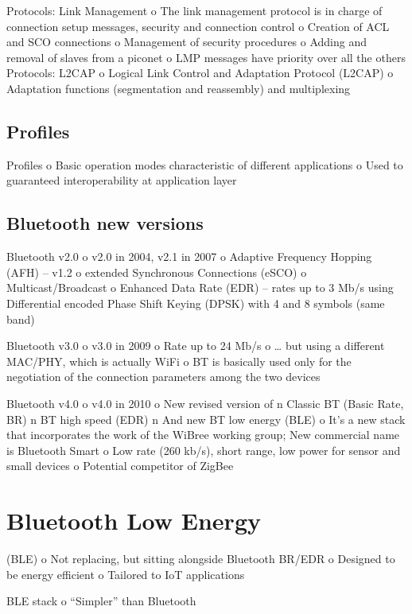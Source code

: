 Protocols: Link Management
o The link management protocol is in
charge of connection setup messages,
security and connection control
o Creation of ACL and SCO connections
o Management of security procedures
o Adding and removal of slaves from a
piconet
o LMP messages have priority over all
the others
Protocols: L2CAP
o Logical Link Control and Adaptation Protocol
(L2CAP)
o Adaptation functions (segmentation and
reassembly) and multiplexing

\subsection{Profiles}
Profiles
o Basic operation modes characteristic of different
applications
o Used to guaranteed interoperability at application
layer






\subsection{Bluetooth new versions}
Bluetooth v2.0
o v2.0 in 2004, v2.1 in 2007
o Adaptive Frequency Hopping (AFH) –
v1.2
o extended Synchronous Connections
(eSCO)
o Multicast/Broadcast
o Enhanced Data Rate (EDR) – rates up
to 3 Mb/s using Differential encoded
Phase Shift Keying (DPSK) with 4 and
8 symbols (same band)

Bluetooth v3.0
o v3.0 in 2009
o Rate up to 24 Mb/s
o … but using a different MAC/PHY,
which is actually WiFi
o BT is basically used only for the
negotiation of the connection
parameters among the two devices

Bluetooth v4.0
o v4.0 in 2010
o New revised version of
n Classic BT (Basic Rate, BR)
n BT high speed (EDR)
n And new BT low energy (BLE)
o It’s a new stack that incorporates the work
of the WiBree working group; New
commercial name is Bluetooth Smart
o Low rate (260 kb/s), short range, low
power for sensor and small devices
o Potential competitor of ZigBee





\section{Bluetooth Low Energy}
 (BLE)
o Not replacing, but sitting alongside
Bluetooth BR/EDR
o Designed to be energy efficient
o Tailored to IoT applications

BLE stack
o “Simpler” than Bluetooth

